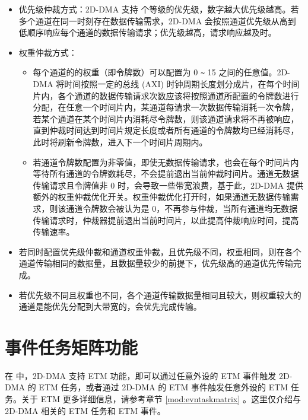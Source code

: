 \documentclass[main\_\_CN.tex]{subfiles}
\begin{document}
\begin{itemize}
\item 优先级仲裁方式：2D-DMA 支持 
 个等级的优先级，数字越大优先级越高。若多个通道在同一时刻存在数据传输需求，2D-DMA 会按照通道优先级从高到低顺序响应每个通道的数据传输请求；优先级越高，请求响应越及时。
\item 权重仲裁方式：
    \begin{itemize}
        \item 每个通道的的权重（即令牌数）可以配置为 0 \verb+~+ 15 之间的任意值。2D-DMA 将时间按照一定的总线 (AXI) 时钟周期长度划分成片，在每个时间片内，各个通道的数据传输请求次数应该将按照通道所配置的令牌数进行分配，在任意一个时间片内，某通道每请求一次数据传输消耗一次令牌，若某个通道在某个时间片内消耗尽令牌数，则该通道请求将不再被响应，直到仲裁时间达到时间片规定长度或者所有通道的令牌数均已经消耗尽，此时将刷新令牌数，进入下一个时间片周期内。
        \item 若通道令牌数配置为非零值，即使无数据传输请求，也会在每个时间片内等待所有通道的令牌数耗尽，不会提前退出当前仲裁时间片。通道无数据传输请求且令牌值非 0 时，会导致一些带宽浪费，基于此，2D-DMA 提供额外的权重仲裁优化开关。权重仲裁优化打开时，如果通道无数据传输需求，则该通道令牌数会被认为是 0，不再参与仲裁，当所有通道均无数据传输请求时，仲裁器提前退出当前时间片，以此提高仲裁响应时间，提高传输速率。
    \end{itemize}
\end{itemize}

\begin{tiplisting}
\vspace{-2em}
\begin{itemize}
    \item 若同时配置优先级仲裁和通道权重仲裁，且优先级不同，权重相同，则在各个通道传输相同的数据量，且数据量较少的前提下，优先级高的通道优先传输完成。
    \item 若优先级不同且权重也不同，各个通道传输数据量相同且较大，则权重较大的通道是能优先分配到大带宽的，会优先完成传输。
\end{itemize}
\end{tiplisting}




\section{事件任务矩阵功能} \label{sec:dma2d-etm-func}

在 \chipname{} 中，2D-DMA 支持 ETM 功能，即可以通过任意外设的 ETM 事件触发 2D-DMA 的 ETM 任务，或者通过 2D-DMA 的 ETM 事件触发任意外设的 ETM 任务。关于 ETM 更多详细信息，请参考章节 \ref{mod:evntaskmatrix} 。这里仅介绍与 2D-DMA 相关的 ETM 任务和 ETM 事件。
\end{document}
